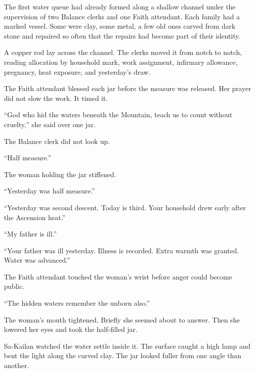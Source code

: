 The first water queue had already formed along a shallow channel under the supervision of two Balance clerks and one Faith attendant.
Each family had a marked vessel.
Some were clay, some metal, a few old ones carved from dark stone and repaired so often that the repairs had become part of their identity.\par

A copper rod lay across the channel.
The clerks moved it from notch to notch, reading allocation by household mark, work assignment, infirmary allowance, pregnancy, heat exposure, and yesterday’s draw.\par

The Faith attendant blessed each jar before the measure was released.
Her prayer did not slow the work.
It timed it.\par

“God who hid the waters beneath the Mountain, teach us to count without cruelty,” she said over one jar.\par

The Balance clerk did not look up.\par

“Half measure.”\par

The woman holding the jar stiffened.\par

“Yesterday was half measure.”\par

“Yesterday was second descent.
Today is third.
Your household drew early after the Ascension heat.”\par

“My father is ill.”\par

“Your father was ill yesterday.
Illness is recorded.
Extra warmth was granted.
Water was advanced.”\par

The Faith attendant touched the woman’s wrist before anger could become public.\par

“The hidden waters remember the unborn also.”\par

The woman’s mouth tightened.
Briefly she seemed about to answer.
Then she lowered her eyes and took the half-filled jar.\par

Sa-Kailan watched the water settle inside it.
The surface caught a high lamp and bent the light along the curved clay.
The jar looked fuller from one angle than another.\par

